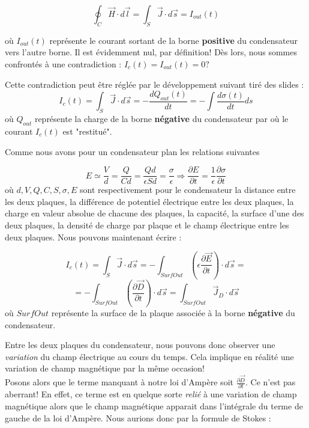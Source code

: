 \[  \oint_{C} \vec{H} \cdot d\vec{l} =  \int_{S} \vec{J} \cdot d\vec{s} = I_{out}(t)\] 

où $I_{out}(t)$ représente le courant sortant de la borne \textbf{positive} du condensateur vers l'autre borne. 
Il est évidemment nul, par définition! Dès lors, nous sommes confrontés à une contradiction : $I_{c}(t) = I_{out}(t) = 0?$ 

Cette contradiction peut être réglée par le développement suivant tiré des slides :
\[I_{c}(t) = \int_{S} \vec{J} \cdot d\vec{s} = -\frac{dQ_{out}(t)}{dt} = - \int \frac{d \sigma(t)}{dt} ds\] 
où $Q_{out}$ représente la charge de la borne \textbf{négative} du condensateur par où le courant $I_{c}(t)$ est "restitué".

Comme nous avons pour un condensateur plan les relations suivantes  

\[ E \simeq \frac{V}{d} = \frac{Q}{Cd} = \frac{Qd}{\epsilon S d} = \frac{\sigma}{\epsilon} \Rightarrow \frac{\partial E}{\partial t} = \frac{1}{\epsilon} \frac{\partial \sigma}{\partial t} \]
où $d,V,Q,C,S,\sigma,E$ sont respectivement pour le condensateur la distance entre les deux plaques, la différence de potentiel électrique entre les deux plaques, la charge en valeur absolue de chacune des plaques, 
la capacité, la surface d'une des deux plaques, la densité de charge par plaque et le champ électrique entre les deux plaques.
Nous pouvons maintenant écrire :

\[ I_{c}(t) = \int_{S} \vec{J} \cdot d\vec{s} = -\int_{SurfOut}( \epsilon \frac{\partial \vec{E}}{\partial t} )\cdot d\vec{s} = \]
\[ = - \int_{SurfOut} (\frac{\partial \vec{D}}{\partial t}) \cdot d\vec{s}  =  \int_{SurfOut} \vec{J}_{D} \cdot d\vec{s}\]
où $SurfOut$ représente la surface de la plaque associée à la borne \textbf{négative} du condensateur.

Entre les deux plaques du condensateur, nous pouvons donc observer une \textit{variation} du champ électrique au cours du temps. Cela implique en réalité une variation de champ magnétique par la même occasion! \\
Posons alors que le terme manquant à notre loi d'Ampère soit $\frac{\partial \vec{D}}{\partial t}$. Ce n'est pas aberrant!
En effet, ce terme est en quelque sorte \textit{relié} à une variation de champ magnétique alors que le champ magnétique apparait dans l'intégrale du terme de gauche de la loi d'Ampère.
Nous aurions donc par la formule de Stokes : 

